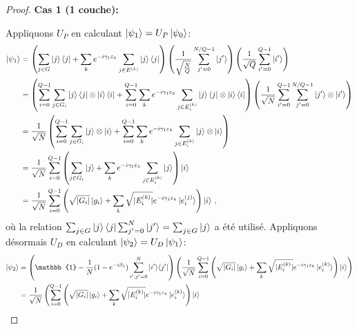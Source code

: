 \begin{proof}
\newpage
\textbf{Cas 1 (1 couche):}

Appliquons $U_{P}$ en calculant $\ket{\psi_{1}} = U_{P} \ket{\psi_{0}}$:
\begin{equation}
\begin{aligned}
    \ket{\psi_{1}} & = \left(\sum_{j \in G} \ket{j}\bra{j} + \sum_{k} e^{-i \gamma_{1} \varepsilon_{k}} \sum_{j \in E^{(k)}} \ket{j}\bra{j} \right) \left( \frac{1}{ \sqrt{ \frac{N}{Q} }} \sum_{j'=0}^{N/Q-1} \ket{j'} \right) \left( \frac{1}{\sqrt{ Q }} \sum_{i'=0}^{Q-1} \ket{i'} \right) \\
    & = \left( \sum_{i=0}^{Q-1} \sum_{j \in G_{i}} \ket{j}\bra{j} \otimes \ket{i}\bra{i} + \sum_{i=0}^{Q-1} \sum_{k} e^{-i \gamma_{1} \varepsilon_{k}} \sum_{j \in E^{(k)}_{i}} \ket{j}\bra{j} \otimes  \ket{i}\bra{i} \right) \left( \frac{1}{ \sqrt{ N }} \sum_{i'=0}^{Q-1} \sum_{j'=0}^{N/Q-1} \ket{j'} \otimes  \ket{i'} \right) \\
    & = \frac{1}{ \sqrt{ N }} \left( \sum_{i=0}^{Q-1} \sum_{j \in G_{i}} \ket{j} \otimes \ket{i} + \sum_{i=0}^{Q-1} \sum_{k} e^{-i \gamma_{1} \varepsilon_{k}} \sum_{j \in E^{(k)}_{i}} \ket{j} \otimes  \ket{i} \right) \\
    & = \frac{1}{ \sqrt{ N }} \sum_{i=0}^{Q-1}  \left( \sum_{j \in G_{i}} \ket{j} + \sum_{k} e^{-i \gamma_{1} \varepsilon_{k}} \sum_{j \in E^{(k)}_{i}} \ket{j} \right) \ket{i} \\
    & = \frac{1}{ \sqrt{ N }} \sum_{i=0}^{Q-1}  \left( \sqrt{ \lvert G_{i} \rvert  } \ket{g_{i}} + \sum_{k} \sqrt{ \lvert E^{(k)}_{i} \rvert  } e^{-i \gamma_{1} \varepsilon_{k}} \ket{e^{(j)}_{i}} \right) \ket{i} \,,
\end{aligned}
\end{equation}
où la relation $\sum_{j \in G}\ket{j}\bra{j} \sum_{j'=0}^{N} \ket{j'} = \sum_{j \in G} \ket{j}$ a été utilisé. Appliquons désormais $U_{D}$ en calculant $\ket{\psi_{2}} = U_{D}\ket{\psi_{1}}$:
\begin{equation}
\begin{aligned}
    \ket{\psi_{2}} &= \left( \mathbb{1} - \frac{1}{N} (1 - e^{-i\beta_{1}}) \sum_{i',j'=0}^{N} \ket{i'}\!\bra{j'} \right) \left( \frac{1}{ \sqrt{ N }} \sum_{i=0}^{Q-1}  \left( \sqrt{ \lvert G_{i} \rvert  } \ket{g_{i}} + \sum_{k} \sqrt{ \lvert E^{(k)}_{i} \rvert  } e^{-i \gamma_{1} \varepsilon_{k}}  \ket{e^{(k)}_{i}} \right) \ket{i} \right) \\
    &=  \frac{1}{ \sqrt{ N }} \left(  \sum_{i=0}^{Q-1}  \left( \sqrt{ \lvert G_{i} \rvert  } \ket{g_{i}} + \sum_{k} \sqrt{ \lvert E^{(k)}_{i} \rvert  } e^{-i \gamma_{1} \varepsilon_{k}} \ket{e^{(k)}_{i}} \right) \ket{i} \right. \\

\end{aligned}
\end{equation}
\end{proof}
